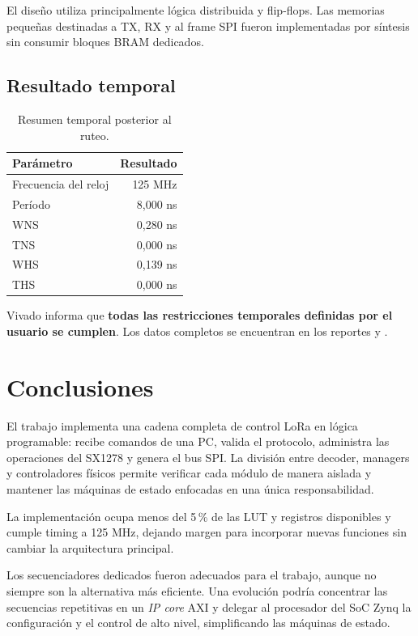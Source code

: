 \documentclass[11pt,a4paper]{article}
\begin{document}
El diseño utiliza principalmente lógica distribuida y flip-flops. Las memorias
pequeñas destinadas a TX, RX y al frame SPI fueron implementadas por síntesis
sin consumir bloques BRAM dedicados.

\subsection{Resultado temporal}

\begin{table}[H]
    \centering
    \caption{Resumen temporal posterior al ruteo.}
    \begin{tabular}{lr}
        \toprule
        \textbf{Parámetro} & \textbf{Resultado} \\
        \midrule
        Frecuencia del reloj & 125 MHz \\
        Período               & 8,000 ns \\
        WNS                   & 0,280 ns \\
        TNS                   & 0,000 ns \\
        WHS                   & 0,139 ns \\
        THS                   & 0,000 ns \\
        \bottomrule
    \end{tabular}
\end{table}

Vivado informa que \textbf{todas las restricciones temporales definidas por el
usuario se cumplen}. Los datos completos se encuentran en los reportes
 y
.

\section{Conclusiones}

El trabajo implementa una cadena completa de control LoRa en lógica
programable: recibe comandos de una PC, valida el protocolo, administra las
operaciones del SX1278 y genera el bus SPI. La división entre decoder, managers
y controladores físicos permite verificar cada módulo de manera aislada y
mantener las máquinas de estado enfocadas en una única responsabilidad.

La implementación ocupa menos del 5\,\% de las LUT y registros disponibles y
cumple timing a 125 MHz, dejando margen para incorporar nuevas funciones sin
cambiar la arquitectura principal.

Los secuenciadores dedicados fueron adecuados para el trabajo, aunque no
siempre son la alternativa más eficiente. Una evolución podría concentrar las
secuencias repetitivas en un \emph{IP core} AXI y delegar al procesador del SoC
Zynq la configuración y el control de alto nivel, simplificando las máquinas de
estado.
\end{document}
